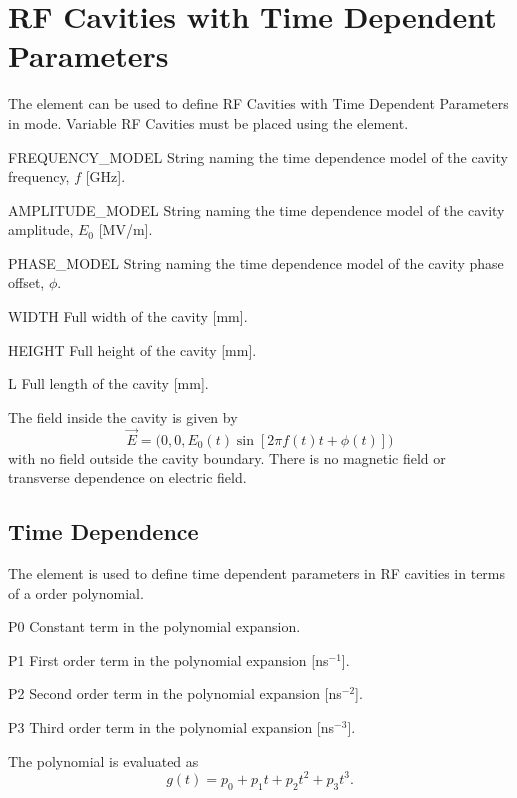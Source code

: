 \clearpage
\section{RF Cavities with Time Dependent Parameters}
\label{sec:variable-rf-cavity-cycl}
The  element can be used to define RF Cavities with
Time Dependent Parameters in \opalcycl mode. Variable RF Cavities must be
placed using the  element.
\begin{kdescription}
\item[FREQUENCY\_MODEL]
  String naming the time dependence model of the cavity frequency, $f$ [\si{\giga\hertz}].
\item[AMPLITUDE\_MODEL]
  String naming the time dependence model of the cavity amplitude, $E_0$ [\si{\mega\volt/\meter}].
\item[PHASE\_MODEL]
  String naming the time dependence model of the cavity phase offset, $\phi$.
\item[WIDTH]
  Full width of the cavity [\si{\milli\meter}].
  \item[HEIGHT]
  Full height of the cavity [\si{\milli\meter}].
  \item[L]
  Full length of the cavity [\si{\milli\meter}].
\end{kdescription}
The field inside the cavity is given by
\begin{equation}
\vec{E} = \big(0, 0, E_0(t)\sin[2\pi f(t) t+\phi(t)]\big)
\end{equation}
with no field outside the cavity boundary. There is no magnetic field or
transverse dependence on electric field.

\subsection{Time Dependence}
\label{sec:polynomial-time-dependence}
The  element is used to define time dependent
parameters in RF cavities in terms of a  order polynomial.
\begin{kdescription}
\item[P0]
  Constant term in the polynomial expansion.
\item[P1]
  First order term in the polynomial expansion [ns$^{-1}$].
\item[P2]
  Second order term in the polynomial expansion [ns$^{-2}$].
  \item[P3]
  Third order term in the polynomial expansion [ns$^{-3}$].
\end{kdescription}
The polynomial is evaluated as
\begin{equation}
g(t) = p_0 + p_1 t + p_2 t^2 + p_3 t^3 %
.
\end{equation}

